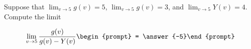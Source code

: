 \documentclass{ximera}
\author{Matthew Carr}
\begin{document}
\begin{exercise}
Suppose that $\lim_{v\to5}g(v)=5$, $\lim_{v\to5}g(v)=3$, and $\lim_{v\to5}Y(v)=4$. Compute the limit

\[
\lim_{v\to 5 } \frac{g(v)}{g(v)-Y(v)}\begin{prompt} = \answer{-5}\end{prompt}
\]
\end{exercise}
\end{document}
